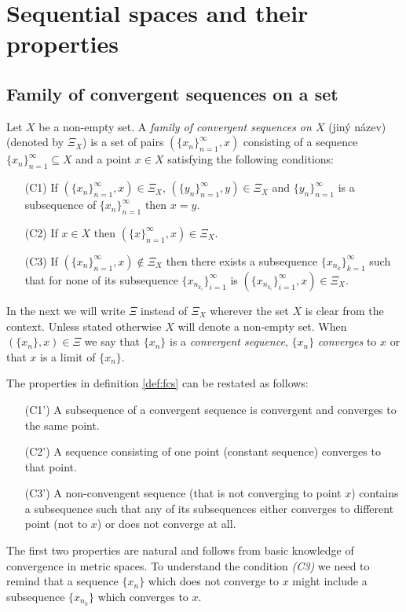 \chapter{Sequential spaces and their properties} 

\section{Family of convergent sequences on a set}

\begin{define}\label{def:fcs}
Let $X$ be a non-empty set. A \emph{family of convergent sequences on $X$} \tbd(jiný název) (denoted by $\Xi_X$) is a set of pairs $(\{x_n\}^\infty_{n=1},x)$ consisting of a sequence $\{x_n\}^\infty_{n=1}\subseteq X$ and a point $x\in X$ satisfying the following conditions:
\begin{enumerate}
	\item[(C1)] If $(\{x_n\}^\infty_{n=1},x)\in\Xi_X$, $(\{y_n\}^\infty_{n=1},y)\in\Xi_X$ and $\{y_n\}^\infty_{n=1}$ is a subsequence of $\{x_n\}^\infty_{n=1}$ then $x=y$.
	\item[(C2)] If $x\in X$ then $(\{x\}^\infty_{n=1},x)\in\Xi_X$.
	\item[(C3)] If  $(\{x_n\}^\infty_{n=1},x)\notin\Xi_X$ then there exists a subsequence $\{x_{n_k}\}^\infty_{k=1}$ such that for none of its subsequence $\{x_{n_{k_i}}\}^\infty_{i=1}$ is $(\{x_{n_{k_i}}\}^\infty_{i=1},x)\in\Xi_X$.
\end{enumerate}
\end{define}

In the next we will write $\Xi$ instead of $\Xi_X$ wherever the set $X$ is clear from the context. Unless stated otherwise $X$ will denote a non-empty set. When $(\{x_n\},x)\in\Xi$ we say that $\{x_n\}$ is  a \emph{convergent sequence}, $\{x_n\}$ \emph{converges} to $x$ or that $x$ is a limit of  $\{x_n\}$.

The properties in definition \ref{def:fcs} can be restated as follows:
\begin{enumerate}
	\item[(C1')] A subsequence of a convergent sequence is convergent and converges to the same point.
	\item[(C2')] A sequence consisting of one point (constant sequence) converges to that point.
	\item[(C3')] A non-convengent sequence (that is not converging to point $x$) contains a subsequence such that any of its subsequences either converges to different point (not to $x$) or does not converge at all.
\end{enumerate}
The first two properties are natural and follows from basic knowledge of convergence in metric spaces. To understand the condition \emph{(C3)} we need to remind that a sequence $\{x_n\}$ which does not converge to $x$ might include a subsequence $\{x_{n_k}\}$ which converges to $x$.

